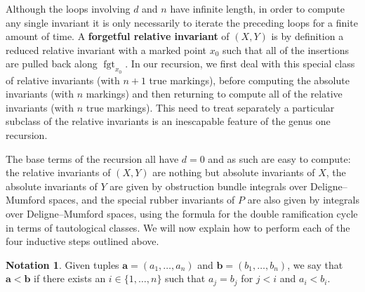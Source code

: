 \documentclass[11pt]{amsart}
\newcommand{\fgt}{\operatorname{fgt}}
\theoremstyle{definition}
\newtheorem{notation}[thm]{Notation}
\theoremstyle{definition}
\begin{document}
\begin{algorithm}
\DontPrintSemicolon
{}
\end{algorithm}
\noindent Although the loops involving $d$ and $n$ have infinite length, in order to compute any single invariant it is only necessarily to iterate the preceding loops for a finite amount of time. A \textbf{forgetful relative invariant} of $(X,Y)$ is by definition a reduced relative invariant with a marked point $x_0$ such that all of the insertions are pulled back along $\fgt_{x_0}$. In our recursion, we first deal with this special class of relative invariants (with $n+1$ true markings), before computing the absolute invariants (with $n$ markings) and then returning to compute all of the relative invariants (with $n$ true markings). This need to treat separately a particular subclass of the relative invariants is an inescapable feature of the genus one recursion.

The base terms of the recursion all have $d=0$ and as such are easy to compute: the relative invariants of $(X,Y)$ are nothing but absolute invariants of $X$, the absolute invariants of $Y$ are given by obstruction bundle integrals over Deligne--Mumford spaces, and the special rubber invariants of $P$ are also given by integrals over Deligne--Mumford spaces, using the formula for the double ramification cycle \cite{Hain,JPPZ} in terms of tautological classes. We will now explain how to perform each of the four inductive steps outlined above.

\begin{notation}Given tuples $\mathbf{a}=(a_1,\ldots,a_n)$ and $\mathbf{b}=(b_1,\ldots,b_n)$, we say that $\mathbf{a}<\mathbf{b}$ if there exists an $i \in \{1,\ldots,n\}$ such that $a_j = b_j$ for $j < i$ and $a_i < b_i$.\end{notation}
\end{document}
